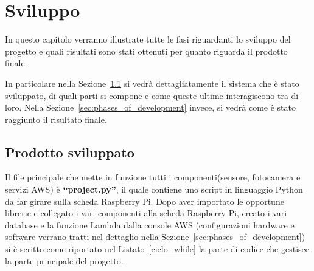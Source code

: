 \chapter{Sviluppo}
\label{ch:development}

In questo capitolo verranno illustrate tutte le fasi riguardanti lo sviluppo del progetto e quali risultati sono stati ottenuti per quanto riguarda il prodotto finale. 

In particolare nella Sezione~\ref{sec:product_development} si vedrà dettagliatamente il sistema che è stato sviluppato, di quali parti si compone
e come queste ultime interagiscono tra di loro. Nella Sezione~\ref{sec:phases_of_development} invece, si vedrà come è stato raggiunto il risultato finale.

\section{Prodotto sviluppato}
\label{sec:product_development}

Il file principale che mette in funzione tutti i componenti(sensore, fotocamera e servizi AWS) è \textbf{``project.py''}, il quale contiene uno script in linguaggio 
Python da far girare sulla scheda Raspberry Pi.
Dopo aver importato le opportune librerie e collegato i vari componenti alla scheda Raspberry Pi, creato i vari database e la funzione Lambda dalla console AWS
(configurazioni hardware e software verrano tratti nel dettaglio nella Sezione~\ref{sec:phases_of_development}) si è scritto come riportato nel 
Listato~\ref{ciclo_while} la parte di codice che gestisce la parte principale del progetto.


